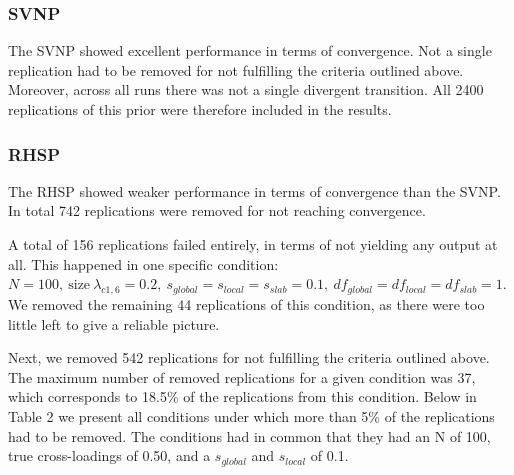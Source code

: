 \documentclass[
  man, donotrepeattitle,floatsintext]{apa6}
\begin{document}
\hypertarget{svnp}{%
\subsubsection{SVNP}\label{svnp}}

The SVNP showed excellent performance in terms of convergence. Not a single replication had to be removed for not fulfilling the criteria outlined above. Moreover, across all runs there was not a single divergent transition. All 2400 replications of this prior were therefore included in the results.

\hypertarget{rhsp}{%
\subsubsection{RHSP}\label{rhsp}}

The RHSP showed weaker performance in terms of convergence than the SVNP. In total 742 replications were removed for not reaching convergence.

A total of 156 replications failed entirely, in terms of not yielding any output at all. This happened in one specific condition: \(N = 100, \ \text{size} \ \lambda_{c1,6} = 0.2, \ s_{global} = s_{local} = s_{slab} = 0.1, \ df_{global} = df_{local} = df_{slab} = 1\). We removed the remaining 44 replications of this condition, as there were too little left to give a reliable picture.

Next, we removed 542 replications for not fulfilling the criteria outlined above. The maximum number of removed replications for a given condition was 37, which corresponds to 18.5\% of the replications from this condition. Below in Table 2 we present all conditions under which more than 5\% of the replications had to be removed. The conditions had in common that they had an N of 100, true cross-loadings of 0.50, and a \(s_{global}\) and \(s_{local}\) of 0.1.
\end{document}
